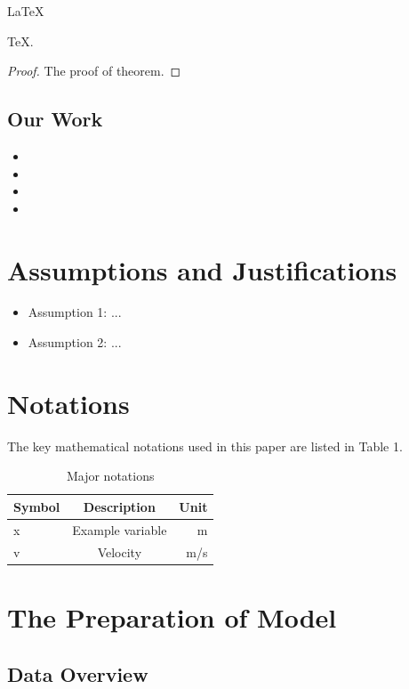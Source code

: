 \documentclass{mcmthesis}
\begin{document}
	\begin{Theorem} \label{thm:latex}
		\LaTeX
	\end{Theorem}
	\begin{Lemma} \label{thm:tex}
		\TeX .
	\end{Lemma}
	\begin{proof}
		The proof of theorem.
	\end{proof}
	
	\subsection{Our Work}
	\lipsum[6]
	\begin{itemize}
		\item
		\item
		\item
		\item
	\end{itemize}
	
	\lipsum[7]
	
	\section{Assumptions and Justifications}
	\begin{itemize}
	\item Assumption 1: ...
	\item Assumption 2: ...
	\end{itemize}
	\section{Notations}
	The key mathematical notations used in this paper are listed in Table 1.
	\begin {table}[htbp]
	\centering
	\caption {Major notations}
	\begin {tabular}{l c r} %
	\toprule [1pt] %
	\textbf {Symbol} & \textbf {Description} & \textbf {Unit} \\
	\midrule %
	x & Example variable & m \\
	v & Velocity & m/s \\
	\bottomrule [1pt] %
	\end {tabular}
	\end {table}
	\section{The Preparation of Model}
	\subsection{Data Overview}
\end{document}
